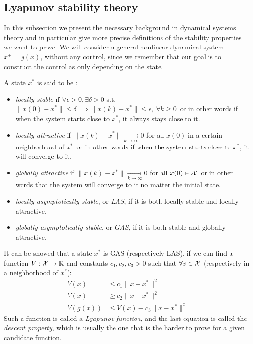 \documentclass[12pt]{article}
\begin{document}
\subsection{Lyapunov stability theory}\label{sec:Lyapunov-stability-theory}
In this subsection we present the necessary background in dynamical systems theory and in particular give more precise definitions of the stability properties we want to prove.
We will consider a general nonlinear dynamical system $x^+=g(x)$, without any control, since we remember that our goal is to construct the control as only depending on the state.

\noindent A state $x^*$ is said to be :
\begin{itemize}[label=\textbullet]
	\item \textit{locally stable} if $\forall\epsilon>0,\exists \delta>0$ s.t. $\|x(0)-x^*\|\leq\delta\implies\|x(k)-x^*\|\leq\epsilon,~\forall k\geq 0$\, or in other words if when the system starts close to $x^*$, it always stays close to it.
	\item \textit{locally attractive} if $\|x(k)-x^*\|\underset{k\to\infty}{\longrightarrow}0$ for all $x(0)$ in a certain neighborhood of $x^*$\, or in other words if when the system starts close to $x^*$, it will converge to it.
	\item \textit{globally attractive} if $\|x(k)-x^*\|\underset{k\to\infty}{\longrightarrow}0$ for all $x(0)\in\cal{X}$\, or in other words that the system will converge to it no matter the initial state.
	\item \textit{locally asymptotically stable}, or \textit{LAS}, if it is both locally stable and locally attractive.
	\item \textit{globally asymptotically stable}, or \textit{GAS}, if it is both stable and globally attractive.
\end{itemize}

It can be showed that a state $x^*$ is GAS (respectively LAS), if we can find a function $V:\cal{X}\to\R$ and constants $c_1,c_2,c_3>0$ such that $\forall x\in\cal{X}$ (respectively in a neighborhood of $x^*$):
\begin{align*}
	V(x)&\leq c_1\|x-x^*\|^2\\
	V(x)&\geq c_2\|x-x^*\|^2\\
	V(g(x))&\leq V(x)-c_3\|x-x^*\|^2
\end{align*}
Such a function is called a \textit{Lyapunov function}, and the last equation is called the \textit{descent property}, which is usually the one that is the harder to prove for a given candidate function.
\end{document}
